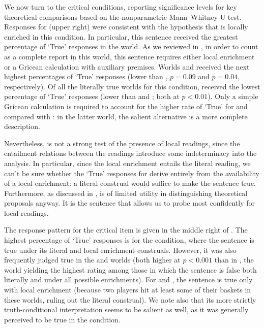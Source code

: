 \documentclass[leqno,12pt]{article}
\begin{document}
We now turn to the critical conditions, reporting significance levels
for key theoretical comparisons based on the nonparametric
Mann--Whitney U test. Responses for  (upper right)
were consistent with the hypothesis that  is locally
enriched in this condition. In particular, this sentence received the
greatest percentage of `True' responses in the  world. As
we reviewed in , in order to count as a
complete report in this world, this sentence requires either local
enrichment or a Gricean calculation with auxiliary premises. Worlds
 and  received the next highest percentages of
`True' responses (lower than , $p = 0.09$ and $p = 0.04$,
respectively). Of all the literally true worlds for this condition,
 received the lowest percentage of `True' responses (lower
than  and ; both at $p < 0.01$).  Only a simple
Gricean calculation is required to account for the higher rate of
`True' for  and  compared with : in
the latter world, the salient alternative  is a more complete description.

Nevertheless,  is not a strong test of the
presence of local readings, since the entailment relations between the
readings introduce some indeterminacy into the analysis. In
particular, since the local enrichment entails the literal reading, we
can't be sure whether the `True' responses for  derive
entirely from the availability of a local enrichment: a literal
construal would suffice to make the sentence true. Furthermore, as
discussed in ,  is of
limited utility in distinguishing theoretical proposals anyway. It is
the  sentence that allows us to probe most
confidently for local readings.

The response pattern for the critical item 
is given in the middle right of . The
highest percentage of `True' responses is for the 
condition, where the sentence is true under its literal and local
enrichment construals. However, it was also frequently judged true in
the  and  worlds (both higher at $p < 0.001$
than in , the world yielding the highest rating among those
in which the sentence is false both literally and under all possible
enrichments). For  and , the sentence is true
only with local enrichment (because two players hit at least some of
their baskets in these worlds, ruling out the literal construal).  We
note also that its more strictly truth-conditional interpretation
seems to be salient as well, as it was generally perceived to be true
in the  condition.
\end{document}
